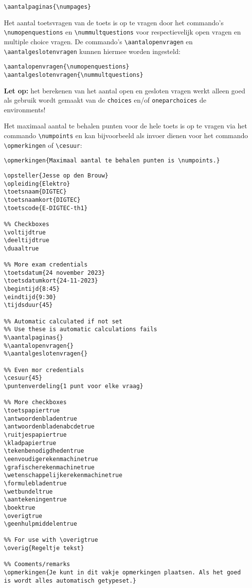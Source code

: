 \documentclass[12pt,dutch,addpoints,fleqn]{tisdexam}
\begin{document}
\verb|\aantalpaginas{\numpages}|

Het aantal toetsvragen van de toets is op te vragen door het commando's \verb|\numopenquestions| en
\verb|\nummultquestions| voor respectievelijk open vragen en multiple choice vragen.
De commando's \verb|\aantalopenvragen| en \verb|\aantalgeslotenvragen| kunnen hiermee worden ingesteld:

\verb|\aantalopenvragen{\numopenquestions}| \\
\verb|\aantalgeslotenvragen{\nummultquestions}|

\textbf{Let op:} het berekenen van het aantal open en gesloten vragen werkt alleen goed als gebruik wordt gemaakt van de \verb|choices| en/of \verb|oneparchoices| de environments!

Het maximaal aantal te behalen punten voor de hele toets is op te vragen via het commando
\verb|\numpoints| en kan bijvoorbeeld als invoer dienen voor het commando \verb|\opmerkingen| of
\verb|\cesuur|:

\verb|\opmerkingen{Maximaal aantal te behalen punten is \numpoints.}|

\newpage

\begin{lstlisting}
\opsteller{Jesse op den Brouw}
\opleiding{Elektro}
\toetsnaam{DIGTEC}
\toetsnaamkort{DIGTEC}
\toetscode{E-DIGTEC-th1}

%% Checkboxes
\voltijdtrue
\deeltijdtrue
\duaaltrue

%% More exam credentials
\toetsdatum{24 november 2023}
\toetsdatumkort{24-11-2023}
\begintijd{8:45}
\eindtijd{9:30}
\tijdsduur{45}

%% Automatic calculated if not set
%% Use these is automatic calculations fails
%\aantalpaginas{}
%\aantalopenvragen{}
%\aantalgeslotenvragen{}

%% Even mor credentials
\cesuur{45}
\puntenverdeling{1 punt voor elke vraag}

%% More checkboxes
\toetspapiertrue
\antwoordenbladentrue
\antwoordenbladenabcdetrue
\ruitjespapiertrue
\kladpapiertrue
\tekenbenodigdhedentrue
\eenvoudigerekenmachinetrue
\grafischerekenmachinetrue
\wetenschappelijkerekenmachinetrue
\formulebladentrue
\wetbundeltrue
\aantekeningentrue
\boektrue
\overigtrue
\geenhulpmiddelentrue

%% For use with \overigtrue
\overig{Regeltje tekst}

%% Cooments/remarks
\opmerkingen{Je kunt in dit vakje opmerkingen plaatsen. Als het goed is wordt alles automatisch getypeset.}
\end{lstlisting}
\end{document}
